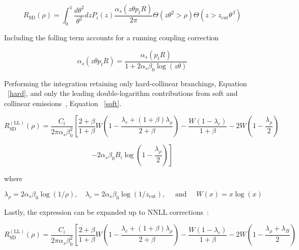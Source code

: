 \begin{equation}
R_{\mathrm{SD}}(\rho)=\int_{0}^{1} \frac{d \theta^{2}}{\theta^{2}} d z P_{i}(z) \frac{\alpha_{s}\left(z \theta p_{t} R\right)}{2 \pi} \Theta\left(z \theta^{2}>\rho\right) \Theta\left(z>z_{\mathrm{cut}} \theta^{\beta}\right)
\end{equation}


Including the folling term accounts for a running coupling correction~\cite{Marzani:2019hun}

\begin{equation}
\alpha_{s}\left(z \theta p_{t} R\right)=\frac{\alpha_{s}\left(p_{t} R\right)}{1+2 \alpha_{s} \beta_{0} \log (z \theta)}
\end{equation}


Performing the integration retaining only hard-collinear branchings, Equation ~\ref{hard}, and only the leading double-logarithm contributions from soft and collinear emissions~\cite{Marzani:2019hun}, Equation ~\ref{soft}.



\begin{equation}
R_{\mathrm{SD}}^{(\mathrm{LL})}(\rho)=\frac{C_{i}}{2 \pi \alpha_{s} \beta_{0}^{2}}\left[\frac{2+\beta}{1+\beta} W\left(1-\frac{\lambda_{c}+(1+\beta) \lambda_{\rho}}{2+\beta}\right)-\frac{W\left(1-\lambda_{c}\right)}{1+\beta}-2 W\left(1-\frac{\lambda_{\rho}}{2}\right)\right.
\end{equation}\label{soft}



\begin{equation}
\left.-2 \alpha_{s} \beta_{0} B_{i} \log \left(1-\frac{\lambda_{\rho}}{2}\right)\right]
\end{equation}\label{hard}

where

\begin{equation}
\lambda_{\rho}=2 \alpha_{s} \beta_{0} \log (1 / \rho), \quad \lambda_{c}=2 \alpha_{s} \beta_{0} \log \left(1 / z_{\mathrm{cut}}\right), \quad \text { and } \quad W(x)=x \log (x)
\end{equation}



Lastly, the expression can be expanded up to NNLL corrections~\cite{Marzani:2019hun}:

\begin{equation}
R_{\mathrm{SD}}^{(\mathrm{LL})}(\rho)=\frac{C_{i}}{2 \pi \alpha_{s} \beta_{0}^{2}}\left[\frac{2+\beta}{1+\beta} W\left(1-\frac{\lambda_{c}+(1+\beta) \lambda_{\rho}}{2+\beta}\right)-\frac{W\left(1-\lambda_{c}\right)}{1+\beta}-2 W\left(1-\frac{\lambda_{\rho}+\lambda_{B}}{2}\right)\right.
\end{equation}


